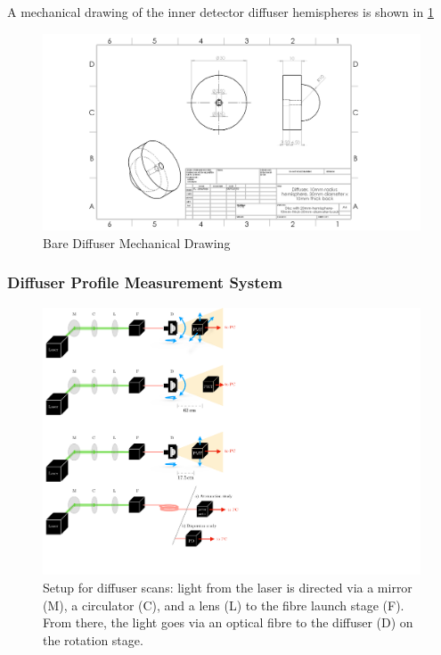 \documentclass[a4paper,11pt]{article}
\begin{document}
A mechanical drawing of the inner detector diffuser hemispheres is shown in \cref{fig:Bare_Diffuser_Mechanical}

\begin{figure}
    \centering
    \includegraphics[width=\textwidth]{BareDiffuser.PNG}
    \caption{Bare Diffuser Mechanical Drawing}
    \label{fig:Bare_Diffuser_Mechanical}
\end{figure}

\subsubsection{Diffuser Profile Measurement System}

\begin{figure}[t]
    \centering
    \includegraphics[width=\textwidth]{diffuser_setup_new.pdf}
    \caption{Setup for diffuser scans: light from the laser is directed via a mirror (M), a circulator (C), and a lens (L) to the fibre launch stage (F). From there, the light goes via an optical fibre to the diffuser (D) on the rotation stage.}
    \label{fig:setup}
\end{figure}
\end{document}
